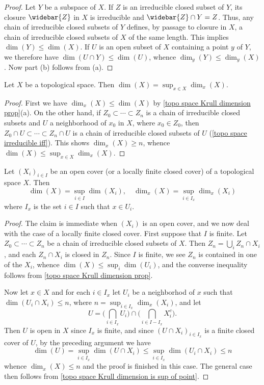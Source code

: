 \begin{proof}
Let $Y$ be a subspace of $X$. If $Z$ is an irreducible closed subset of $Y$, its closure $\widebar{Z}$ in $X$ is irreducible and $\widebar{Z}\cap Y=Z$. Thus, any chain of irreducible closed subsets of $Y$ defines, by passage to closure in $X$, a chain of irreducible closed subsets of $X$ of the same length. This implies $\dim(Y)\leq\dim(X)$. If $U$ is an open subset of $X$ containing a point $y$ of $Y$, we therefore have $\dim(U\cap Y)\leq\dim(U)$, whence $\dim_y(Y)\leq\dim_y(X)$. Now part (b) follows from (a).
\end{proof}
\begin{proposition}\label{topo space Krull dimension is sup of point}
Let $X$ be a topological space. Then $\dim(X)=\sup_{x\in X}\dim_x(X)$.
\end{proposition}
\begin{proof}
First we have $\dim_x(X)\leq\dim(X)$ by \cref{topo space Krull dimension prop}(a). On the other hand, if $Z_0\subset\cdots\subset Z_n$ is a chain of irreducible closed subsets and $U$ a neighborhood of $x_0$ in $X$, where $x_0\in Z_0$, then $Z_0\cap U\subset\cdots\subset Z_n\cap U$ is a chain of irreducible closed subsets of $U$ (\cref{topo space irreducible iff}). This shows $\dim_x(X)\geq n$, whence $\dim(X)\leq\sup_{x\in X}\dim_x(X)$. 
\end{proof}
\begin{corollary}\label{topo space Krull dimension and cover}
Let $(X_i)_{i\in I}$ be an open cover (or a locally finite closed cover) of a topological space $X$. Then
\[\dim(X)=\sup_{i\in I}\dim(X_i),\quad \dim_x(X)=\sup_{i\in I_x}\dim_x(X_i)\]
where $I_x$ is the set $i\in I$ such that $x\in U_i$. 
\end{corollary}
\begin{proof}
The claim is immediate when $(X_i)$ is an open cover, and we now deal with the case of a locally finite closed cover. First suppose that $I$ is finite. Let $Z_0\subset\cdots\subset Z_n$ be a chain of irreducible closed subsets of $X$. Then $Z_n=\bigcup_iZ_n\cap X_i$, and each $Z_n\cap X_i$ is closed in $Z_n$. Since $I$ is finite, we see $Z_n$ is contained in one of the $X_i$, whence $\dim(X)\leq\sup_i\dim(U_i)$, and the converse inequality follows from \cref{topo space Krull dimension prop}.\par
Now let $x\in X$ and for each $i\in I_x$ let $U_i$ be a neighborhod of $x$ such that $\dim(U_i\cap X_i)\leq n$, where $n=\sup_{i\in I_x}\dim_x(X_i)$, and let
\[U=\Big(\bigcap_{i\in I_x}U_i\Big)\cap\Big(\bigcap_{i\in I-I_x}X_i^c\Big).\]
Then $U$ is open in $X$ since $I_x$ is finite, and since $(U\cap X_i)_{i\in I_x}$ is a finite closed cover of $U$, by the preceding argument we have
\[\dim(U)=\sup_{i\in I_x}\dim(U\cap X_i)\leq\sup_{i\in I_x}\dim(U_i\cap X_i)\leq n\]
whence $\dim_x(X)\leq n$ and the proof is finished in this case. The general case then follows from \cref{topo space Krull dimension is sup of point}.
\end{proof}
